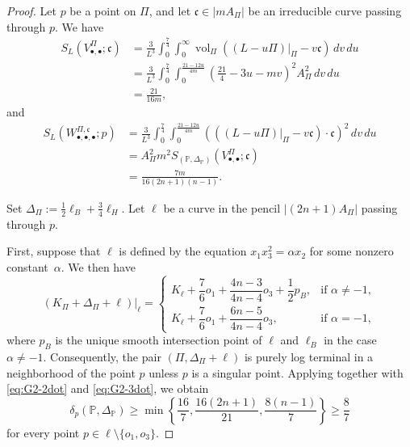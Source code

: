 \documentclass[12pt]{amsart}
\theoremstyle{definition}
\theoremstyle{remark}
\begin{document}
\begin{proof}
Let  $p$ be a point on $\Pi$, and let $\mathfrak{c}\in |mA_\Pi|$ be an irreducible curve passing through $p$. We have
\begin{equation}\label{eq:G2-2dot}
\begin{split}
S_L(V_{\bullet,\bullet}^{\Pi};\mathfrak{c})
&=
\frac{3}{L^3}
\int_0^{\frac{7}{4}}
\int_0^{\infty}
\operatorname{vol}_{\Pi}\left((L-u\Pi)|_{\Pi}-v\mathfrak{c}\right)\,dv\,du \\
&=
\frac{3}{L^3}
\int_0^{\frac{7}{4}}
\int_0^{\frac{21-12u}{4m}}
\left(\frac{21}{4}-3u-mv\right)^2A_\Pi^2\,dv\,du \\
&=
\frac{21}{16m},
\end{split}
\end{equation}
and
\begin{equation}\label{eq:G2-3dot}
\begin{split}
S_L(W_{\bullet,\bullet,\bullet}^{\Pi,\mathfrak{c}};p)
&=
\frac{3}{L^3}
\int_0^{\frac{7}{4}}
\int_0^{\frac{21-12u}{4m}}
\left(\left((L-u\Pi)|_{\Pi}-v\mathfrak{c}\right)\cdot\mathfrak{c}\right)^2\,dv\,du \\
&=
A_\Pi^2m^2
S_{(\mathbb{P}, \Delta_\mathbb{P})}(V_{\bullet,\bullet}^{\Pi};\mathfrak{c}) \\
&=
\frac{7m}{16(2n+1)(n-1)}.
\end{split}
\end{equation}

Set
$
\Delta_{\Pi}:=\frac{1}{2}\ell_B+\frac{3}{4}\ell_H$.
Let $\ell$ be a curve in the pencil $|(2n+1)A_\Pi|$ passing through $p$.

First,  suppose  that $\ell$ is defined by the equation
$
x_1x_3^2=\alpha x_2
$
for some nonzero constant~$\alpha$. We then have
\[
\left(K_\Pi+\Delta_\Pi+\ell\right)\big|_\ell=
\begin{cases}
K_\ell+\dfrac{7}{6}o_1+\dfrac{4n-3}{4n-4}o_3+\dfrac{1}{2}p_B,
& \text{if }\alpha\neq -1, \\[1ex]
K_\ell+\dfrac{7}{6}o_1+\dfrac{6n-5}{4n-4}o_3,
& \text{if }\alpha=-1,
\end{cases}
\]
where $p_B$ is the unique smooth intersection point of $\ell$ and $\ell_B$ in the case $\alpha\neq -1$. 
Consequently, the pair $(\Pi,\Delta_\Pi+\ell)$ is purely log terminal in a neighborhood of the point $p$ unless $p$ is a singular point.
Applying \cite[Corollary~4.8]{Fu23} together with \eqref{eq:G2-2dot} and \eqref{eq:G2-3dot}, we obtain
\[
\delta_{p}\left(\mathbb{P},\Delta_\mathbb{P}\right)
\ge
\min\left\{
\frac{16}{7},
\frac{16(2n+1)}{21},
\frac{8(n-1)}{7}
\right\}
\ge
\frac{8}{7}
\]
for every point $p\in \ell\setminus\{o_1, o_3\}$.




\end{proof}
\end{document}
